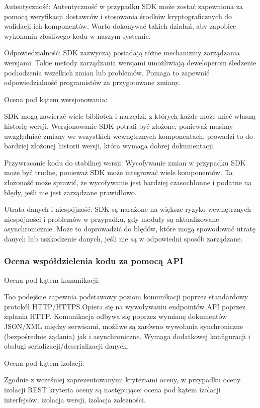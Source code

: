 \documentclass[runningheads,12pt]{llncs}
\begin{document}
Autentyczność: Autentyczność w przypadku SDK może zostać zapewniona za pomocą weryfikacji dostawców i stosowania środków kryptograficznych do walidacji ich komponentów. Warto dokonywać takich działań, aby zapobiec wykonaniu złośliwego kodu w naszym systemie. ~\cite[para 7]{azure2020}

Odpowiedzialność: SDK zazwyczaj posiadają różne mechanizmy zarządzania wersjami. Takie metody zarządzania wersjami umożliwiają deweloperom śledzenie pochodzenia wszelkich zmian lub problemów. Pomaga to zapewnić odpowiedzialność programistów za przygotowane zmiany. ~\cite[para 7]{azure2020}

Ocena pod kątem wersjonowania:

SDK mogą zawierać wiele bibliotek i narzędzi, z których każde może mieć własną historię wersji. Wersjonowanie SDK potrafi być złożone, ponieważ musimy uwzględniać zmiany we wszystkich wewnętrznych komponentach, prowadzi to do bardziej złożonej historii wersji, która wymaga dobrej dokumentacji. ~\cite[para. 3]{azure2020}

Przywracanie kodu do stabilnej wersji: Wycofywanie zmian w przypadku SDK może być trudne, ponieważ SDK może integrować wiele komponentów. Ta złożoność może sprawić, że wycofywanie jest bardziej czasochłonne i podatne na błędy, jeśli nie jest zarządzane prawidłowo. ~\cite[para. 3]{azure2020}

Utrata danych i niespójność: SDK są narażone na większe ryzyko wewnętrznych niespójności i problemów w przypadku, gdy moduły są aktualizowane asynchronicznie. Może to doprowadzić do błędów, które mogą spowodować utratę danych lub uszkodzenie danych, jeśli nie są w odpowiedni sposób zarządzane. ~\cite[para. 3]{azure2020}
\subsubsection{Ocena współdzielenia kodu za pomocą API}

Ocena pod kątem komunikacji:

Too podejście zapewnia podstawowy poziom komunikacji poprzez standardowy protokół HTTP/HTTPS.Opiera się na wywoływaniu endpointów API poprzez żądania HTTP. Komunikacja odbywa się poprzez wymianę dokumentów JSON/XML między serwisami, możliwe są zarówno wywołania synchroniczne (bezpośrednie żądania) jak i asynchroniczne. Wymaga dodatkowej konfiguracji i obsługi serializacji/deserializacji danych.

Ocena pod kątem izolacji:

Zgodnie z wcześniej zaprezentowanymi kryteriami oceny, w przypadku oceny izolacji REST kryteria oceny są następujące: ocena pod kątem izolacji interfejsów, izolacja wersji, izolacja zależności.
\end{document}
